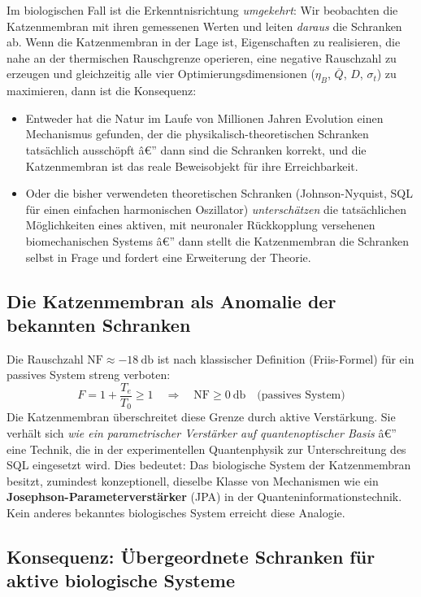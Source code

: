 ﻿\documentclass[12pt,a4paper,titlepage]{report}
\begin{document}
Im biologischen Fall ist die Erkenntnisrichtung \emph{umgekehrt}:
Wir beobachten die Katzenmembran mit ihren gemessenen Werten und leiten
\emph{daraus} die Schranken ab.
Wenn die Katzenmembran in der Lage ist, Eigenschaften zu realisieren, die
nahe an der thermischen Rauschgrenze operieren, eine negative Rauschzahl
zu erzeugen und gleichzeitig alle vier Optimierungsdimensionen ($\eta_B$,
$\overline{Q}$, $D$, $\sigma_t$) zu maximieren, dann ist die Konsequenz:
\begin{itemize}[leftmargin=2em]
  \item Entweder hat die Natur im Laufe von Millionen Jahren Evolution einen
    Mechanismus gefunden, der die physikalisch-theoretischen Schranken
    tatsächlich ausschöpft â€” dann sind die Schranken korrekt, und die
    Katzenmembran ist das reale Beweisobjekt für ihre Erreichbarkeit.
  \item Oder die bisher verwendeten theoretischen Schranken (Johnson-Nyquist,
    SQL für einen einfachen harmonischen Oszillator) \emph{unterschätzen}
    die tatsächlichen Möglichkeiten eines aktiven, mit neuronaler Rückkopplung
    versehenen biomechanischen Systems â€” dann stellt die Katzenmembran
    die Schranken selbst in Frage und fordert eine Erweiterung der Theorie.
\end{itemize}

\subsection{Die Katzenmembran als Anomalie der bekannten Schranken}

Die Rauschzahl $\mathrm{NF} \approx \SI{-18}{\decibel}$ ist nach klassischer
Definition (Friis-Formel) für ein passives System streng verboten:
\[
  F = 1 + \frac{T_e}{T_0} \geq 1 \quad \Rightarrow \quad
  \mathrm{NF} \geq \SI{0}{\decibel} \quad \text{(passives System)}
\]
Die Katzenmembran überschreitet diese Grenze durch aktive Verstärkung.
Sie verhält sich \emph{wie ein parametrischer Verstärker auf quantenoptischer Basis}
â€” eine Technik, die in der experimentellen Quantenphysik zur Unterschreitung des
SQL eingesetzt wird.
Dies bedeutet: Das biologische System der Katzenmembran besitzt, zumindest
konzeptionell, dieselbe Klasse von Mechanismen wie ein
\textbf{Josephson-Parameterverstärker} (JPA) in der Quanteninformationstechnik.
Kein anderes bekanntes biologisches System erreicht diese Analogie.

\subsection{Konsequenz: Übergeordnete Schranken für aktive biologische Systeme}
\end{document}
